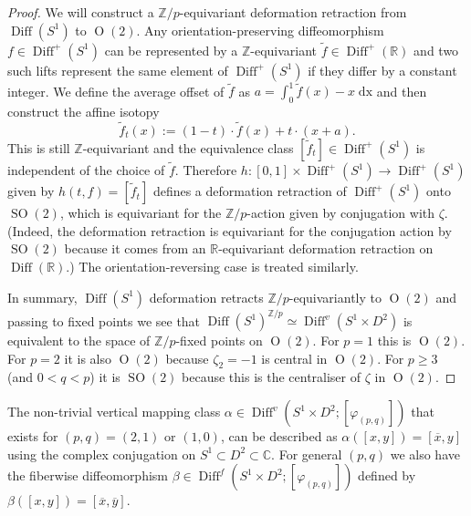 \documentclass{amsart}
\theoremstyle{plain}
\theoremstyle{definition}
\DeclareMathOperator\Diff{Diff}
\DeclareMathOperator\SO{SO}
\DeclareMathOperator\Or{O}
\newcommand{\bbZ}{\mathbb{Z}}
\newcommand{\bbR}{\mathbb{R}}
\begin{document}
\begin{proof}
    We will construct a $\bbZ/p$-equivariant deformation retraction from $\Diff(S^1)$ to $\Or(2)$.
    Any orientation-preserving diffeomorphism $f \in \Diff^+(S^1)$ can be represented by a $\bbZ$-equivariant $\tilde{f} \in \Diff^+(\bbR)$ and two such lifts represent the same element of $\Diff^+(S^1)$ if they differ by a constant integer.
    We define the average offset of $\tilde{f}$ as $a = \int_0^1 \tilde{f}(x) - x\; \mathrm{dx}$ and then construct the affine isotopy
    \[
        \tilde{f}_t(x) := (1-t) \cdot \tilde{f}(x) + t \cdot (x + a).
    \]
    This is still $\bbZ$-equivariant and the equivalence class $[\tilde{f}_t] \in \Diff^+(S^1)$ is independent of the choice of $\tilde{f}$.
    Therefore $h\colon [0,1] \times \Diff^+(S^1) \to \Diff^+(S^1)$ given by $h(t,f)= [\tilde{f}_t]$ defines a deformation retraction of $\Diff^+(S^1)$ onto $\SO(2)$, which is equivariant for the $\bbZ/p$-action given by conjugation with $\zeta$.
    (Indeed, the deformation retraction is equivariant for the conjugation action by $\SO(2)$ because it comes from an $\bbR$-equivariant deformation retraction on $\Diff(\bbR)$.)
    The orientation-reversing case is treated similarly.

    In summary, $\Diff(S^1)$ deformation retracts $\bbZ/p$-equivariantly to $\Or(2)$ and passing to fixed points we see that $\Diff(S^1)^{\bbZ/p} \simeq \Diff^v(S^1 \times D^2)$ is equivalent to the space of $\bbZ/p$-fixed points on $\Or(2)$.
    For $p=1$ this is $\Or(2)$.
    For $p=2$ it is also $\Or(2)$ because $\zeta_2 = -1$ is central in $\Or(2)$.
    For $p\ge 3$ (and $0<q<p$) it is $\SO(2)$ because this is the centraliser of $\zeta$ in $\Or(2)$.
\end{proof}

The non-trivial vertical mapping class $\alpha \in \Diff^v(S^1 \times D^2; [\varphi_{(p,q)}])$ that exists for $(p,q) = (2,1)$ or $(1,0)$, can be described as $\alpha([x,y]) = [\overline{x}, y]$ using the complex conjugation on $S^1 \subset D^2 \subset \mathbb{C}$.
For general $(p,q)$ we also have the fiberwise diffeomorphism $\beta \in \Diff^f(S^1\times D^2; [\varphi_{(p,q)}])$ defined by $\beta([x,y]) = [\overline{x}, \overline{y}]$.
\end{document}
